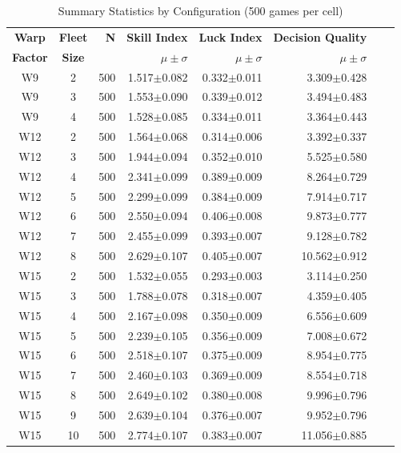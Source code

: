 \begin{table}[htbp]
\centering
\caption{Summary Statistics by Configuration (500 games per cell)}
\label{tab:summary-stats}
\small
\begin{tabular}{@{}ccrrrrrr@{}}
\toprule
\textbf{Warp} & \textbf{Fleet} & \textbf{N} & \textbf{Skill Index} & \textbf{Luck Index} & \textbf{Decision Quality} \\
\textbf{Factor} & \textbf{Size} & & $\mu \pm \sigma$ & $\mu \pm \sigma$ & $\mu \pm \sigma$ \\
\midrule
W9 & 2 & 500 & 1.517$\pm$0.082 & 0.332$\pm$0.011 & 3.309$\pm$0.428 \\
W9 & 3 & 500 & 1.553$\pm$0.090 & 0.339$\pm$0.012 & 3.494$\pm$0.483 \\
W9 & 4 & 500 & 1.528$\pm$0.085 & 0.334$\pm$0.011 & 3.364$\pm$0.443 \\
\midrule
W12 & 2 & 500 & 1.564$\pm$0.068 & 0.314$\pm$0.006 & 3.392$\pm$0.337 \\
W12 & 3 & 500 & 1.944$\pm$0.094 & 0.352$\pm$0.010 & 5.525$\pm$0.580 \\
W12 & 4 & 500 & 2.341$\pm$0.099 & 0.389$\pm$0.009 & 8.264$\pm$0.729 \\
W12 & 5 & 500 & 2.299$\pm$0.099 & 0.384$\pm$0.009 & 7.914$\pm$0.717 \\
W12 & 6 & 500 & 2.550$\pm$0.094 & 0.406$\pm$0.008 & 9.873$\pm$0.777 \\
W12 & 7 & 500 & 2.455$\pm$0.099 & 0.393$\pm$0.007 & 9.128$\pm$0.782 \\
W12 & 8 & 500 & 2.629$\pm$0.107 & 0.405$\pm$0.007 & 10.562$\pm$0.912 \\
\midrule
W15 & 2 & 500 & 1.532$\pm$0.055 & 0.293$\pm$0.003 & 3.114$\pm$0.250 \\
W15 & 3 & 500 & 1.788$\pm$0.078 & 0.318$\pm$0.007 & 4.359$\pm$0.405 \\
W15 & 4 & 500 & 2.167$\pm$0.098 & 0.350$\pm$0.009 & 6.556$\pm$0.609 \\
W15 & 5 & 500 & 2.239$\pm$0.105 & 0.356$\pm$0.009 & 7.008$\pm$0.672 \\
W15 & 6 & 500 & 2.518$\pm$0.107 & 0.375$\pm$0.009 & 8.954$\pm$0.775 \\
W15 & 7 & 500 & 2.460$\pm$0.103 & 0.369$\pm$0.009 & 8.554$\pm$0.718 \\
W15 & 8 & 500 & 2.649$\pm$0.102 & 0.380$\pm$0.008 & 9.996$\pm$0.796 \\
W15 & 9 & 500 & 2.639$\pm$0.104 & 0.376$\pm$0.007 & 9.952$\pm$0.796 \\
W15 & 10 & 500 & 2.774$\pm$0.107 & 0.383$\pm$0.007 & 11.056$\pm$0.885 \\

\end{tabular}
\end{table}
